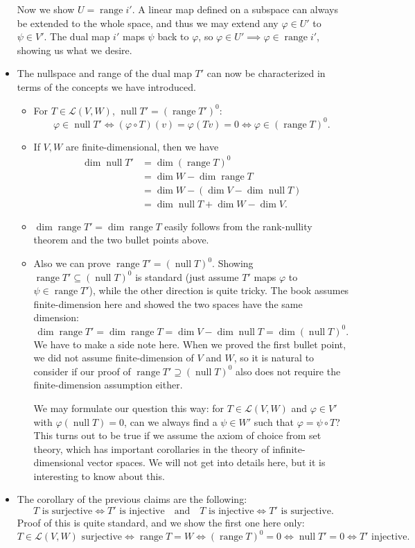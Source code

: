 \documentclass{article}
\newcommand{\n}{\operatorname{null}}
\renewcommand{\r}{\operatorname{range}}
\renewcommand{\d}{\dim}
\newcommand{\LVW}{\mathcal{L}(V,W)}
\renewcommand{\phi}{\varphi}
\begin{document}
\begin{itemize}
    Now we show $U = \r i'$. A linear map defined on a subspace can always be extended to the whole space, and thus we may extend any $\phi \in U'$ to $\psi \in V'$. The dual map $i'$ maps $\psi$ back to $\phi$, so $\phi \in U' \implies \phi \in \r i'$, showing us what we desire.
    \item The nullspace and range of the dual map $T'$ can now be characterized in terms of the concepts we have introduced.
    \begin{itemize}
        \item For $T \in \LVW$, $\n T' = (\r T')^0$: $$\phi \in \n T' \Longleftrightarrow (\phi \circ T)(v) = \phi(Tv) = 0 \Longleftrightarrow \phi \in (\r T)^0.$$
        \item If $V,W$ are finite-dimensional, then we have
        \begin{align*}
            \d \n T' & = \d (\r T)^0 \\
            & = \d W - \d \r T \\
            & = \d W - (\d V - \d \n T) \\
            & = \d \n T + \d W - \d V.
        \end{align*}
        \item $\d \r T' = \d \r T$ easily follows from the rank-nullity theorem and the two bullet points above.
        \item Also we can prove $\r T' = (\n T)^0$. Showing $\r T' \subseteq (\n T)^0$ is standard (just assume $T'$ maps $\phi$ to $\psi \in \r T'$), while the other  direction is quite tricky. The book assumes finite-dimension here and showed the two spaces have the same dimension: $$\d \r T' = \d \r T = \d V - \d \n T = \d (\n T)^0.$$
        We have to make a side note here. When we proved the first bullet point, we did not assume finite-dimension of $V$ and $W$, so it is natural to consider if our proof of $\r T' \supseteq (\n T)^0$ also does not require the finite-dimension assumption either.
        
        We may formulate our question this way: for $T \in \LVW$ and $\phi \in V'$ with $\phi(\n T) = 0$, can we always find a $\psi \in W'$ such that $\phi = \psi \circ T$? This turns out to be true if we assume the axiom of choice from set theory, which has important corollaries in the theory of infinite-dimensional vector spaces. We will not get into details here, but it is interesting to know about this.
    \end{itemize}
    \item The corollary of the previous claims are the following:
    $$T \text{ is surjective} \iff T' \text{ is injective} \quad \text{and} \quad T \text{ is injective} \iff T' \text{ is surjective}.$$ Proof of this is quite standard, and we show the first one here only: $$T \in \LVW \text{ surjective} \iff \r T = W \iff (\r T)^0 = {0} \iff \n T' = {0} \iff T' \text{ injective}.$$
    

\end{itemize}
\end{document}
